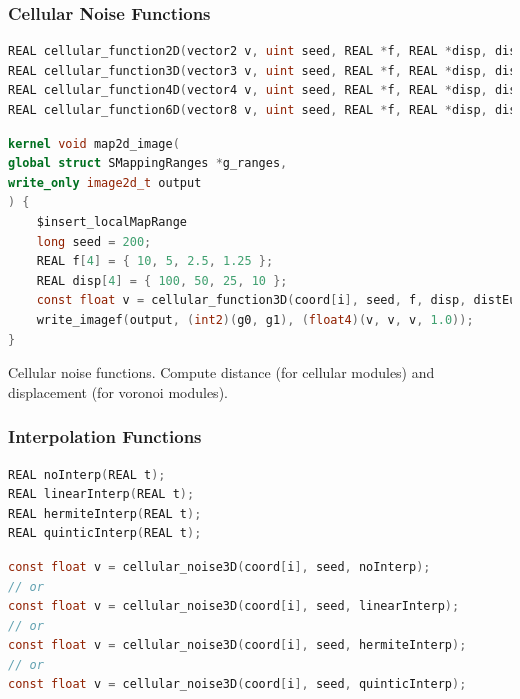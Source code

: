 \subsubsection{Cellular Noise Functions}

\begin{lstlisting}[caption={Definition of cellular noise functions},label={lst:cellular_noise_definition},language=OpenCL]
REAL cellular_function2D(vector2 v, uint seed, REAL *f, REAL *disp, dist_func2 distance);
REAL cellular_function3D(vector3 v, uint seed, REAL *f, REAL *disp, dist_func3 distance);
REAL cellular_function4D(vector4 v, uint seed, REAL *f, REAL *disp, dist_func4 distance);
REAL cellular_function6D(vector8 v, uint seed, REAL *f, REAL *disp, dist_func6 distance);
\end{lstlisting}

\begin{lstlisting}[caption={Example for cellular noise functions},label={lst:cellular_noise_example},language=OpenCL]
kernel void map2d_image(
global struct SMappingRanges *g_ranges,
write_only image2d_t output
) {
    $insert_localMapRange
    long seed = 200;
    REAL f[4] = { 10, 5, 2.5, 1.25 };
    REAL disp[4] = { 100, 50, 25, 10 };
    const float v = cellular_function3D(coord[i], seed, f, disp, distEuclid3);
    write_imagef(output, (int2)(g0, g1), (float4)(v, v, v, 1.0));
}
\end{lstlisting}

Cellular noise functions. 
Compute distance (for cellular modules) and displacement (for voronoi modules).

\subsubsection{Interpolation Functions}

\begin{lstlisting}[caption={Definition of interpolation functions},label={lst:interpolation_definition},language=OpenCL]
REAL noInterp(REAL t);
REAL linearInterp(REAL t);
REAL hermiteInterp(REAL t);
REAL quinticInterp(REAL t);
\end{lstlisting}

\begin{lstlisting}[caption={Example for interpolation functions},label={lst:interpolation_example},language=OpenCL]
const float v = cellular_noise3D(coord[i], seed, noInterp);
// or
const float v = cellular_noise3D(coord[i], seed, linearInterp);
// or
const float v = cellular_noise3D(coord[i], seed, hermiteInterp);
// or
const float v = cellular_noise3D(coord[i], seed, quinticInterp);
\end{lstlisting}

